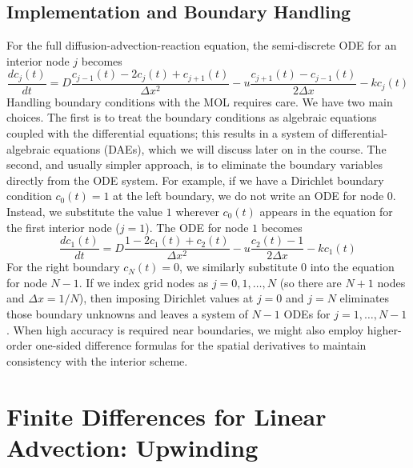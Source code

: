 \subsection{Implementation and Boundary Handling}

For the full diffusion-advection-reaction equation, the semi-discrete ODE for an interior node $j$ becomes
\begin{equation}
    \frac{dc_j(t)}{dt} = D \frac{c_{j-1}(t) - 2c_j(t) + c_{j+1}(t)}{\Delta x^2} - u \frac{c_{j+1}(t) - c_{j-1}(t)}{2\Delta x} - k c_j(t)
\end{equation}
Handling boundary conditions with the MOL requires care. We have two main choices. The first is to treat the boundary conditions as algebraic equations coupled with the differential equations; this results in a system of differential-algebraic equations (DAEs), which we will discuss later on in the course. The second, and usually simpler approach, is to eliminate the boundary variables directly from the ODE system. For example, if we have a Dirichlet boundary condition $c_0(t) = 1$ at the left boundary, we do not write an ODE for node $0$. Instead, we substitute the value $1$ wherever $c_0(t)$ appears in the equation for the first interior node ($j=1$). The ODE for node $1$ becomes
\begin{equation}
    \frac{dc_1(t)}{dt} = D \frac{1 - 2c_1(t) + c_2(t)}{\Delta x^2} - u \frac{c_2(t) - 1}{2\Delta x} - k c_1(t)
\end{equation}
For the right boundary $c_N(t) = 0$, we similarly substitute $0$ into the equation for node $N-1$. If we index grid nodes as $j=0,1,\dots,N$ (so there are $N+1$ nodes and $\Delta x=1/N$), then imposing Dirichlet values at $j=0$ and $j=N$ eliminates those boundary unknowns and leaves a system of $N-1$ ODEs for $j=1,\dots,N-1$. When high accuracy is required near boundaries, we might also employ higher-order one-sided difference formulas for the spatial derivatives to maintain consistency with the interior scheme.

\section{Finite Differences for Linear Advection: Upwinding}

